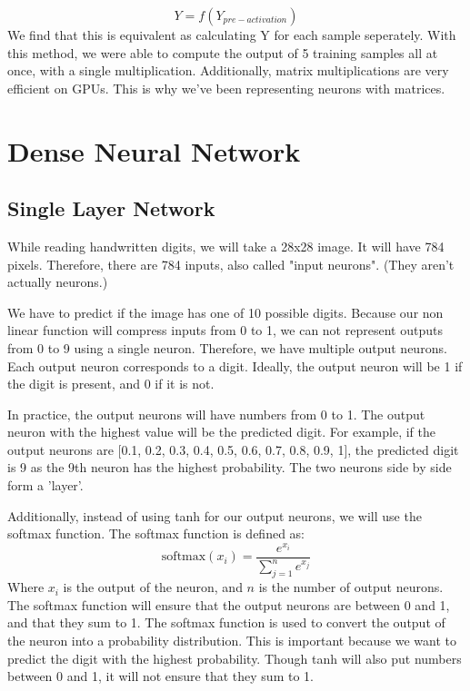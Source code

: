 \documentclass[12pt,a4paper]{article}
\begin{document}
\[
Y = f(Y_{pre-activation})
\]
We find that this is equivalent as calculating Y for each sample seperately. With this method, we were able to compute the output of 5 training samples all at once, with a single multiplication. Additionally, matrix multiplications are very efficient on GPUs. This is why we've been representing neurons with matrices.

\section{Dense Neural Network}
\subsection{Single Layer Network}
While reading handwritten digits, we will take a 28x28 image. It will have 784 pixels. Therefore, there are 784 inputs, also called "input neurons". (They aren't actually neurons.)

We have to predict if the image has one of 10 possible digits. Because our non linear function will compress inputs from 0 to 1, we can not represent outputs from 0 to 9 using a single neuron. Therefore, we have multiple output neurons. Each output neuron corresponds to a digit. Ideally, the output neuron will be 1 if the digit is present, and 0 if it is not.

In practice, the output neurons will have numbers from 0 to 1. The output neuron with the highest value will be the predicted digit. For example, if the output neurons are [0.1, 0.2, 0.3, 0.4, 0.5, 0.6, 0.7, 0.8, 0.9, 1], the predicted digit is 9 as the 9th neuron has the highest probability. The two neurons side by side form a 'layer'.

Additionally, instead of using tanh for our output neurons, we will use the softmax function. The softmax function is defined as:
\[
    \text{softmax}(x_i) = \frac{e^{x_i}}{\sum_{j=1}^{n} e^{x_j}}
\]
Where $x_i$ is the output of the neuron, and $n$ is the number of output neurons. The softmax function will ensure that the output neurons are between 0 and 1, and that they sum to 1.
The softmax function is used to convert the output of the neuron into a probability distribution. This is important because we want to predict the digit with the highest probability. Though tanh will also put numbers between 0 and 1, it will not ensure that they sum to 1. 
\end{document}

